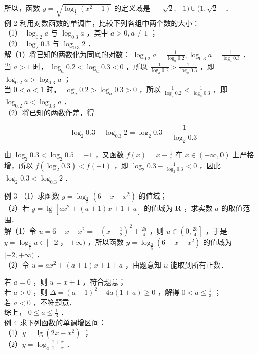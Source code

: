 \documentclass[10pt]{article}
\begin{document}
所以，函数 \(y=\sqrt{\log _{\frac{1}{2}}\left(x^{2}-1\right)}\) 的定义域是 \([-\sqrt{2},-1) \cup(1, \sqrt{2}]\) ．\\
例 2 利用对数函数的单调性，比较下列各组中两个数的大小：\\
（1） \(\log _{0.2} a\) 与 \(\log _{0.3} a\) ，其中 \(a>0, a \neq 1\) ；\\
（2） \(\log _{2} 0.3\) 与 \(\log _{0.3} 2\) ．\\
解（1）将已知的两数化为同底的对数： \(\log _{0.2} a=\frac{1}{\log _{a} 0.2}, \log _{0.3} a=\frac{1}{\log _{a} 0.3}\) ．\\
当 \(a>1\) 时， \(\log _{a} 0.2<\log _{a} 0.3<0\) ，所以 \(\frac{1}{\log _{a} 0.2}>\frac{1}{\log _{a} 0.3}\) ，即 \(\log _{0.2} a>\log _{0.3} a\) ；\\
当 \(0<a<1\) 时， \(\log _{a} 0.2>\log _{a} 0.3>0\) ，所以 \(\frac{1}{\log _{a} 0.2}<\frac{1}{\log _{a} 0.3}\) ，即 \(\log _{0.2} a<\log _{0.3} a\) ．\\
（2）将已知的两数作差，得

\[
\log _{2} 0.3-\log _{0.3} 2=\log _{2} 0.3-\frac{1}{\log _{2} 0.3}
\]

由 \(\log _{2} 0.3<\log _{2} 0.5=-1\) ，又函数 \(f(x)=x-\frac{1}{x}\) 在 \(x \in(-\infty, 0)\) 上严格增，所以 \(f\left(\log _{2} 0.3\right)<f(-1)\) ，即 \(\log _{2} 0.3-\frac{1}{\log _{2} 0.3}<0\) ，因此 \(\log _{2} 0.3<\log _{0.3} 2\) ．

例 3 （1）求函数 \(y=\log _{\frac{2}{5}}\left(6-x-x^{2}\right)\) 的值域；\\
（2）若 \(y=\lg \left[a x^{2}+(a+1) x+1+a\right]\) 的值域为 \(\mathbf{R}\) ，求实数 \(a\) 的取值范围．\\
解（1）令 \(u=6-x-x^{2}=-\left(x+\frac{1}{2}\right)^{2}+\frac{25}{4}\) ，则 \(u \in\left(0, \frac{25}{4}\right]\) ，于是 \(y=\log _{\frac{2}{5}} u \in[-2\) ， \(+\infty)\) ，所以函数 \(y=\log _{\frac{2}{5}}\left(6-x-x^{2}\right)\) 的值域为 \([-2,+\infty)\) ．\\
（2）令 \(u=a x^{2}+(a+1) x+1+a\) ，由题意知 \(u\) 能取到所有正数．

若 \(a=0\) ，则 \(u=x+1\) ，符合题意；\\
若 \(a>0\) ，则 \(\Delta=(a+1)^{2}-4 a(1+a) \geqslant 0\) ，解得 \(0<a \leqslant \frac{1}{3}\) ；\\
若 \(a<0\) ，不符题意．\\
综上， \(0 \leqslant a \leqslant \frac{1}{3}\) ．\\
例 4 求下列函数的单调增区间：\\
（1）\(y=\lg \left(2 x-x^{2}\right)\) ；\\
（2）\(y=\log _{a} \frac{1+x}{1-x}\) ．
\end{document}
